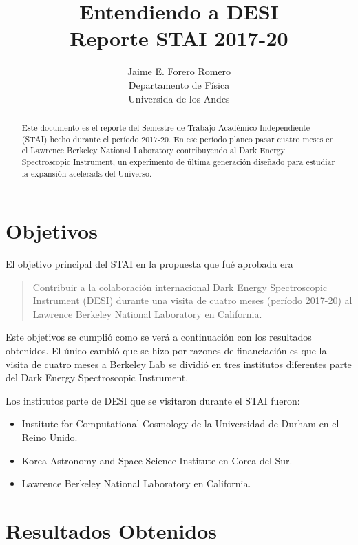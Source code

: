 \documentclass[12pt,spanish]{article}
\title{{\sc Entendiendo a DESI}\\{\small\sc Reporte STAI 2017-20}}
\author{Jaime E. Forero Romero\\Departamento de F\'isica\\Universida
  de los Andes}
\begin{document}
\maketitle
\begin{abstract}
Este documento es el reporte del Semestre de Trabajo Acad\'emico
Independiente (STAI) hecho durante el per\'iodo 2017-20. 
En ese per\'iodo planeo pasar cuatro meses en el Lawrence Berkeley
National Laboratory contribuyendo al Dark Energy Spectroscopic
Instrument, un experimento de \'ultima generaci\'on dise\~nado para
estudiar la expansi\'on acelerada del Universo.
\end{abstract}

\section{Objetivos}

El objetivo principal del STAI en la propuesta que fu\'e aprobada era 
\begin{quote}
Contribuir a la colaboraci\'on internacional Dark Energy Spectroscopic
Instrument (DESI) durante una visita de cuatro meses (per\'iodo
2017-20) al Lawrence Berkeley National Laboratory en California.  
\end{quote}

Este objetivos se cumpli\'o como se ver\'a a continuaci\'on con los
resultados obtenidos.
El \'unico cambi\'o que se hizo por razones de financiaci\'on es que
la visita de cuatro meses a Berkeley Lab se dividi\'o en tres
institutos diferentes parte del Dark Energy Spectroscopic Instrument. 


Los institutos parte de DESI que se visitaron durante el STAI fueron:
\begin{itemize}
\item{Institute for Computational Cosmology de la Universidad de
  Durham en el Reino Unido.}
\item{Korea Astronomy and Space Science Institute en Corea del Sur.}
\item{Lawrence Berkeley National Laboratory en California.}
\end{itemize}


\section*{Resultados Obtenidos}
\end{document}

